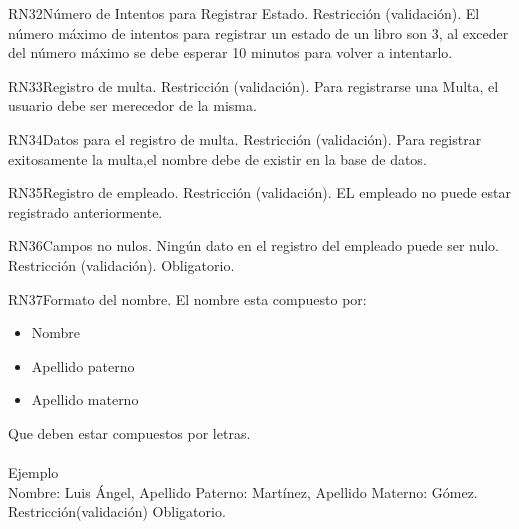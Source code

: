 \begin{BussinesRule}{RN32}{Número de Intentos para Registrar Estado.} 
	\BRitem[Tipo:] Restricción (validación).
	\BRitem[Descripción:]El número máximo de intentos para registrar un estado de un libro  son 3, al exceder del número máximo se debe esperar 10  minutos para volver a intentarlo.
\end{BussinesRule}

\begin{BussinesRule}{RN33}{Registro de multa.} 
	\BRitem[Tipo:] Restricción (validación).
	\BRitem[Descripción:]Para registrarse una Multa, el usuario debe ser merecedor de la misma.
\end{BussinesRule}

\begin{BussinesRule}{RN34}{Datos para el registro de multa.} 
	\BRitem[Tipo:] Restricción (validación).
	\BRitem[Descripción:]Para registrar exitosamente la multa,el nombre debe de existir en la base de datos.
\end{BussinesRule}

\begin{BussinesRule}{RN35}{Registro de empleado.} 
	\BRitem[Tipo:] Restricción (validación).
	\BRitem[Descripción:]EL empleado no puede estar registrado anteriormente.
\end{BussinesRule}

\begin{BussinesRule}{RN36}{Campos no nulos.} 
	\BRitem[Descripción:] Ningún dato en el registro del empleado puede ser nulo.
	\BRitem[Tipo:] Restricción (validación).
	\BRitem[Nivel:] Obligatorio.
\end{BussinesRule}

\begin{BussinesRule}{RN37}{Formato del nombre.}
	\BRitem[Descripción:] El nombre esta compuesto por:
		\begin{itemize} 
			\item Nombre
			\item Apellido paterno 
			\item Apellido materno 
		\end{itemize}
		Que deben estar compuestos por letras.\\\\
Ejemplo \\
	Nombre: Luis Ángel, Apellido Paterno: Martínez, Apellido Materno: Gómez.
	\BRitem[Tipo:] Restricción(validación)
	\BRitem[Nivel:] Obligatorio.
\end{BussinesRule}


